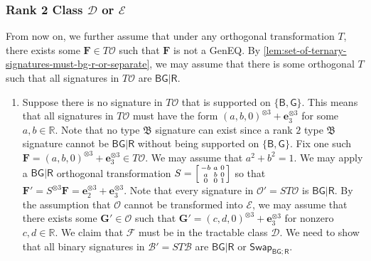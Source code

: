 \documentclass[11pt]{article}
\newcommand{\db}{\mathsf{B}}
\newcommand{\dg}{\mathsf{G}}
\newcommand{\dr}{\mathsf{R}}
\newcommand{\geneq}{\textsf{GenEQ}\xspace}
\newcommand{\swhelper}[1]{$\mathsf{Swap}_{#1}$\xspace}
\newcommand{\swbg}{\swhelper{\db \dg; \dr}}
\newcommand{\teh}{^{\otimes 3}}
\newcommand{\tractBGR}{$\mathscr{D}$\xspace}
\newcommand{\tractBGGRBR}{$\mathscr{E}$\xspace}
\newcommand{\ternarytractz}{$\mathfrak{B}$\xspace}
\begin{document}
\subsubsection{Rank 2 Class \texorpdfstring{\tractBGR}{D} or \texorpdfstring{\tractBGGRBR}{E}}
\label{subsec:can-be-made-bg-r}
From now on, we further assume that under any orthogonal transformation $T$, there exists some $\mathbf{F} \in T \mathcal{O}$ such that $\mathbf{F}$ is not a \geneq.
By \cref{lem:set-of-ternary-signatures-must-bg-r-or-separate}, we may assume that there is some orthogonal $T$ such that all signatures in $T \mathcal{O}$ are $\db \dg | \dr$.
\begin{enumerate}
\item Suppose there is no signature in $T \mathcal{O}$ that is supported on $\{\db, \dg\}$.
    This means that all signatures in $T \mathcal{O}$ must have the form $(a, b, 0)\teh + \mathbf{e}_3\teh$ for some $a, b \in \mathbb{R}$.
    Note that no type \ternarytractz signature can exist since a rank $2$ type \ternarytractz signature cannot be $\db \dg | \dr$ without being supported on $\{\db, \dg\}$.
    Fix one such $\mathbf{F} = (a, b, 0)\teh + \mathbf{e}_3\teh \in T \mathcal{O}$.
    We may assume that $a^2 + b^2 = 1$.
    We may apply a $\db \dg | \dr$ orthogonal transformation $S = \begin{bsmallmatrix}
      -b & a & 0 \\
      a & b & 0 \\
      0 & 0 & 1
    \end{bsmallmatrix}$ so that $\mathbf{F}' = S\teh \mathbf{F} = \mathbf{e}_2\teh + \mathbf{e}_3\teh$.
    Note that every signature in $\mathcal{O}' = S T \mathcal{O}$ is $\db \dg | \dr$.
    By the assumption that $\mathcal{O}$ cannot be transformed into $\mathcal{E}$, we may assume that there exists some $\mathbf{G}' \in \mathcal{O}$ such that 
    $\mathbf{G}' = (c, d, 0)\teh + \mathbf{e}_3\teh$ for nonzero $c, d \in \mathbb{R}$.
    We claim that $\mathcal{F}$ must be in the tractable class \tractBGR.
    We need to show that all binary signatures in $\mathcal{B}' = ST \mathcal{B}$ are $\db \dg | \dr$ or \swbg.


\end{enumerate}
\end{document}
